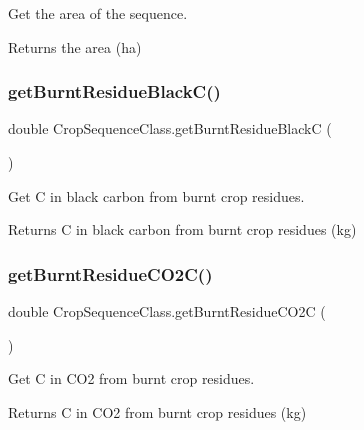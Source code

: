 Get the area of the sequence. 

\begin{DoxyReturn}{Returns}
the area (ha) 
\end{DoxyReturn}
\mbox{\label{class_crop_sequence_class_ab6555a4ed0e9a6b4527e90938d10c61f}} 
\subsubsection{\texorpdfstring{getBurntResidueBlackC()}{getBurntResidueBlackC()}}
{\footnotesize\ttfamily double Crop\+Sequence\+Class.\+get\+Burnt\+Residue\+BlackC (\begin{DoxyParamCaption}{ }\end{DoxyParamCaption})\hspace{0.3cm}{\ttfamily [inline]}}



Get C in black carbon from burnt crop residues. 

\begin{DoxyReturn}{Returns}
C in black carbon from burnt crop residues (kg) 
\end{DoxyReturn}
\mbox{\label{class_crop_sequence_class_a848837241cb4bfeab78ddd81becca5e2}} 
\subsubsection{\texorpdfstring{getBurntResidueCO2C()}{getBurntResidueCO2C()}}
{\footnotesize\ttfamily double Crop\+Sequence\+Class.\+get\+Burnt\+Residue\+C\+O2C (\begin{DoxyParamCaption}{ }\end{DoxyParamCaption})\hspace{0.3cm}{\ttfamily [inline]}}



Get C in C\+O2 from burnt crop residues. 

\begin{DoxyReturn}{Returns}
C in C\+O2 from burnt crop residues (kg) 
\end{DoxyReturn}
\mbox{\label{class_crop_sequence_class_abd6622d0f4e91774943475f725877b0b}} 
